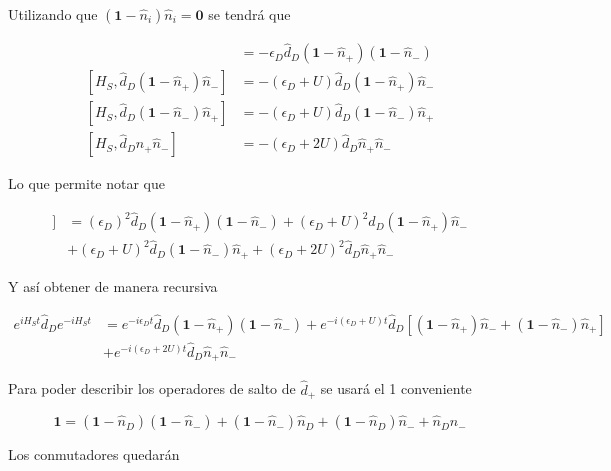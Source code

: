 \begin{appendixs}
Utilizando que $(\textbf{1} - \hat{n}_{i})\hat{n}_{i} = \textbf{0}$ se tendrá que

\begin{align*}
    [H_{S},\hat{d}_{D}(\textbf{1}-\hat{n}_{+})(\textbf{1} - \hat{n}_{-})] & = - \epsilon_{D}\hat{d}_{D}(\textbf{1}-\hat{n}_{+})(\textbf{1} - \hat{n}_{-}) \\
    [H_{S},\hat{d}_{D}(\textbf{1}-\hat{n}_{+})\hat{n}_{-}] & = - (\epsilon_{D} + U)\hat{d}_{D}(\textbf{1} - \hat{n}_{+})\hat{n}_{-} \\
    [H_{S},\hat{d}_{D}(\textbf{1}-\hat{n}_{-})\hat{n}_{+}] & = - (\epsilon_{D} + U)\hat{d}_{D}(\textbf{1} - \hat{n}_{-})\hat{n}_{+} \\
    [H_{S},\hat{d}_{D}\hat{n}_{+}\hat{n}_{-}] & = - (\epsilon_{D} + 2U)\hat{d}_{D}\hat{n}_{+}\hat{n}_{-} 
\end{align*}

Lo que permite notar que

\begin{align*}
    [H_{S},[H_{S},\hat{d}_{D}]] & = (\epsilon_{D})^{2}\hat{d}_{D}(\textbf{1} - \hat{n}_{+}) (\textbf{1} - \hat{n}_{-}) + (\epsilon_{D} + U)^{2}\hat{d}_{D}(\textbf{1} - \hat{n}_{+})\hat{n}_{-} \\
        & + (\epsilon_{D}+U)^{2}\hat{d}_{D}(\textbf{1} - \hat{n}_{-})\hat{n}_{+} + (\epsilon_{D} + 2U)^{2}\hat{d}_{D}\hat{n}_{+}\hat{n}_{-}
\end{align*}

Y así obtener de manera recursiva

\begin{align*}
    e^{i H_{S}t}\hat{d}_{D}e^{-iH_{S}t}  & = e^{-i\epsilon_{D}t} \hat{d}_{D}(\textbf{1} - \hat{n}_{+}) (\textbf{1} - \hat{n}_{-}) +  e^{-i(\epsilon_{D}+U)t} \hat{d}_{D}[(\textbf{1} - \hat{n}_{+})\hat{n}_{-} + (\textbf{1} - \hat{n}_{-})\hat{n}_{+}] \\
    & + e^{-i(\epsilon_{D} + 2U)t}\hat{d}_{D} \hat{n}_{+}\hat{n}_{-}
\end{align*}

Para poder describir los operadores de salto de $\hat{d}_{+}$ se usará el 1 conveniente

\begin{equation*}
    \textbf{1} = (\textbf{1}-\hat{n}_{D})(\textbf{1}-\hat{n}_{-}) + (\textbf{1}-\hat{n}_{-})\hat{n}_{D} + (\textbf{1}-\hat{n}_{D})\hat{n}_{-} + \hat{n}_{D}\hat{n}_{-}
\end{equation*}

Los conmutadores quedarán


\end{appendixs}
